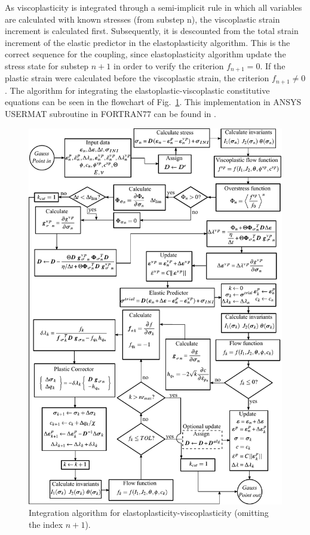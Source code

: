 \documentclass[Journal,letterpaper]{ascelike-new}
\begin{document}
As viscoplasticity is integrated through a semi-implicit rule in which all variables are calculated with known stresses (from substep n), the viscoplastic strain increment is calculated first. Subsequently, it is descounted from the total strain increment of the elastic predictor in the elastoplasticity algorithm. This is the correct sequence for the coupling, since elastoplasticity algorithm update the stress state for substep $n+1$ in order to verify the criterion $f_{n+1}=0$. If the plastic strain were calculated before the viscoplastic strain, the criterion $f_{n+1} \ne 0$. The algorithm for integrating the elastoplastic-viscoplastic constitutive equations can be seen in the flowchart of Fig.~\ref{integração EPVP}. This implementation in ANSYS USERMAT subroutine in FORTRAN77 can be found in .

\begin{figure}
	\centering
	\includegraphics[scale = 1.0]{FIG4.pdf}
	\caption{\label{integração EPVP}Integration algorithm for elastoplasticity-viscoplasticity (omitting the index $n+1$).}
\end{figure}
\end{document}
